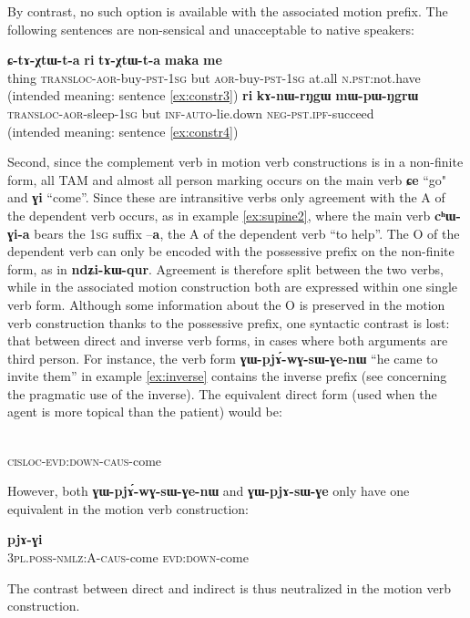\documentclass[oldfontcommands,twoside,a4paper,12pt]{article}
\newcommand{\ipa}[1]{{\phon\textbf{#1}}}
\newcommand{\aor}{\textsc{aor}}
\newcommand{\auto}{\textsc{auto}}
\newcommand{\negat}{\textsc{neg}}
\newcommand{\nonps}{\textsc{n.pst}}
\newcommand{\pl}{\textsc{pl}}
\newcommand{\poss}{\textsc{poss}}
\newcommand{\pst}{\textsc{pst}}
\newcommand{\sg}{\textsc{sg}}
\begin{document}
By contrast, no such option is available with the associated motion prefix. The following sentences are non-sensical and  unacceptable to native speakers:
 \begin{exe}
\ex \label{ex:incorrect2}
\gll  *\ipa{laχtɕʰa} \ipa{ɕ-tɤ-χtɯ-t-a}  \ipa{ri} \ipa{tɤ-χtɯ-t-a} \ipa{maka} \ipa{me} \\
thing \textsc{transloc}-\aor{}-buy-\pst{}-1\sg{} but \aor{}-buy-\pst{}-1\sg{} at.all \nonps{}:not.have\\
\glt  (intended meaning: sentence \ref{ex:constr3}) 
\ex \label{ex:incorrect2}
\gll  *\ipa{ɕ-pɯ-nɯ-rŋgɯ-a}  	\ipa{ri}  	\ipa{kɤ-nɯ-rŋgɯ}  	\ipa{mɯ-pɯ-ŋgrɯ}  \\
\textsc{transloc}-\aor{}-sleep-1\sg{} but	\textsc{inf}-\auto{}-lie.down 	\negat{}-\pst{}.\textsc{ipf}-succeed \\
\glt  (intended meaning: sentence \ref{ex:constr4})

  \end{exe}  

Second, since the complement verb in motion verb constructions is in a non-finite form, all TAM and almost all person marking occurs on the main verb \ipa{ɕe} ``go" and \ipa{ɣi} ``come''. Since these are intransitive verbs  only agreement with the A of the dependent verb occurs, as in example \ref{ex:supine2}, where the main verb \ipa{cʰɯ-ɣi-a} bears the 1\textsc{sg} suffix --\ipa{a}, the A of the dependent verb ``to help''. The O of the dependent verb can only be encoded with the possessive prefix on the non-finite form, as in \ipa{ndʑi-kɯ-qur}. Agreement is therefore split between the two verbs, while in the associated motion construction both are expressed within one single verb form. Although some information about the O is preserved in the motion verb construction thanks to the possessive prefix, one syntactic contrast is lost: that between direct and inverse verb forms, in cases where both arguments are third person. For instance, the verb form \ipa{ɣɯ-pjɤ́-wɣ-sɯ-ɣe-nɯ } ``he came to invite them'' in example \ref{ex:inverse} contains the inverse prefix (see \citealt{jacques10inverse} concerning the pragmatic use of the inverse). The equivalent direct form (used when the agent is more topical than the patient) would be:
  \begin{exe}
\ex
\gll  \ipa{ɣɯ-pjɤ-sɯ-ɣe} \\
      \textsc{cisloc}-\textsc{evd:down}-\textsc{caus}-come \\
   \end{exe}
However, both \ipa{ɣɯ-pjɤ́-wɣ-sɯ-ɣe-nɯ } and  \ipa{ɣɯ-pjɤ-sɯ-ɣe} only have one equivalent in the motion verb construction:
  \begin{exe}
\ex
\gll  \ipa{nɯ-kɯ-sɯ-ɣe} \ipa{pjɤ-ɣi} \\
     3\pl{}.\poss{}-\textsc{nmlz:A}-\textsc{caus}-come \textsc{evd:down}-come\\
   \end{exe}
The contrast between direct and indirect is thus neutralized in the motion verb  construction.
\end{document}
